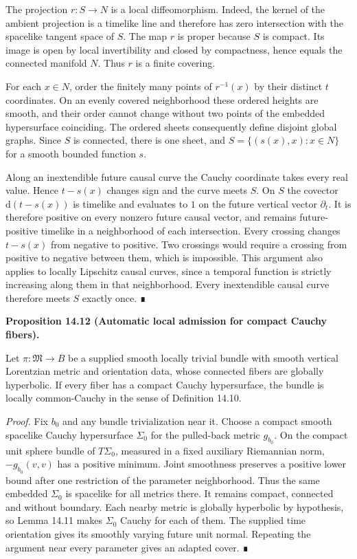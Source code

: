 \documentclass[
  english,
  11pt,
  reqno]{amsart}
\makeatletter
\newcommand{\pandocstatementheading}[1]{%
  \par\addpenalty{\@beginparpenalty}%
  \addvspace{.5\baselineskip plus .2\baselineskip minus .2\baselineskip}%
  {\normalfont\bfseries #1\par}%
  \nobreak\@afterindenttrue\@afterheading
}
\makeatother
\begin{document}
The projection \(r:S\to N\) is a local diffeomorphism. Indeed, the
kernel of the ambient projection is a timelike line and therefore has
zero intersection with the spacelike tangent space of \(S\). The map
\(r\) is proper because \(S\) is compact. Its image is open by local
invertibility and closed by compactness, hence equals the connected
manifold \(N\). Thus \(r\) is a finite covering.

For each \(x\in N\), order the finitely many points of \(r^{-1}(x)\) by
their distinct \(t\) coordinates. On an evenly covered neighborhood
these ordered heights are smooth, and their order cannot change without
two points of the embedded hypersurface coinciding. The ordered sheets
consequently define disjoint global graphs. Since \(S\) is connected,
there is one sheet, and \(S=\{(s(x),x):x\in N\}\) for a smooth bounded
function \(s\).

Along an inextendible future causal curve the Cauchy coordinate takes
every real value. Hence \(t-s(x)\) changes sign and the curve meets
\(S\). On \(S\) the covector \(\mathrm d(t-s(x))\) is timelike and
evaluates to \(1\) on the future vertical vector \(\partial_t\). It is
therefore positive on every nonzero future causal vector, and remains
future-positive timelike in a neighborhood of each intersection. Every
crossing changes \(t-s(x)\) from negative to positive. Two crossings
would require a crossing from positive to negative between them, which
is impossible. This argument also applies to locally Lipschitz causal
curves, since a temporal function is strictly increasing along them in
that neighborhood. Every inextendible causal curve therefore meets \(S\)
exactly once. ∎

\pandocstatementheading{\protect{}\label{prop:compact-fibers-local-cauchy-admission}Proposition 14.12 (Automatic local admission for compact Cauchy fibers).}

Let \(\pi:\mathfrak M\to B\) be a supplied smooth locally trivial bundle
with smooth vertical Lorentzian metric and orientation data, whose
connected fibers are globally hyperbolic. If every fiber has a compact
Cauchy hypersurface, the bundle is locally common-Cauchy in the sense of
Definition 14.10.

\emph{Proof.} Fix \(b_0\) and any bundle trivialization near it. Choose
a compact smooth spacelike Cauchy hypersurface \(\Sigma_0\) for the
pulled-back metric \(g_{b_0}\). On the compact unit sphere bundle of
\(T\Sigma_0\), measured in a fixed auxiliary Riemannian norm,
\(-g_{b_0}(v,v)\) has a positive minimum. Joint smoothness preserves a
positive lower bound after one restriction of the parameter
neighborhood. Thus the same embedded \(\Sigma_0\) is spacelike for all
metrics there. It remains compact, connected and without boundary. Each
nearby metric is globally hyperbolic by hypothesis, so Lemma 14.11 makes
\(\Sigma_0\) Cauchy for each of them. The supplied time orientation
gives its smoothly varying future unit normal. Repeating the argument
near every parameter gives an adapted cover. ∎
\end{document}
